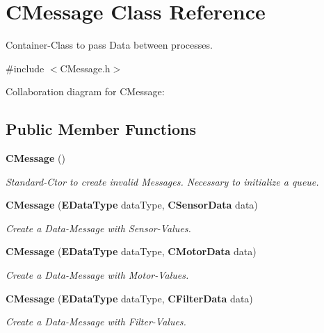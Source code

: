 \section{C\-Message Class Reference}
\label{classCMessage}


Container-\/\-Class to pass Data between processes.  




{\ttfamily \#include $<$C\-Message.\-h$>$}



Collaboration diagram for C\-Message\-:
\subsection*{Public Member Functions}
\begin{DoxyCompactItemize}
\item 
{\bf C\-Message} ()
\begin{DoxyCompactList}\small\item\em Standard-\/\-Ctor to create invalid Messages. Necessary to initialize a queue. \end{DoxyCompactList}\item 
{\bf C\-Message} ({\bf E\-Data\-Type} data\-Type, {\bf C\-Sensor\-Data} data)
\begin{DoxyCompactList}\small\item\em Create a Data-\/\-Message with Sensor-\/\-Values. \end{DoxyCompactList}\item 
{\bf C\-Message} ({\bf E\-Data\-Type} data\-Type, {\bf C\-Motor\-Data} data)
\begin{DoxyCompactList}\small\item\em Create a Data-\/\-Message with Motor-\/\-Values. \end{DoxyCompactList}\item 
{\bf C\-Message} ({\bf E\-Data\-Type} data\-Type, {\bf C\-Filter\-Data} data)
\begin{DoxyCompactList}\small\item\em Create a Data-\/\-Message with Filter-\/\-Values. \end{DoxyCompactList}\end{DoxyCompactItemize}
